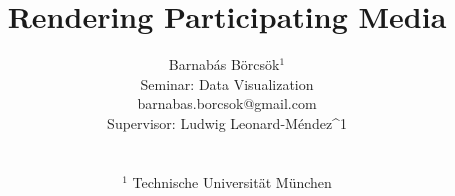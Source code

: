 

\title[Participating Media]%
      {Rendering Participating Media}

\author[B.Börcsök \& L.Leonard]
{\parbox{\textwidth}{\centering Barnabás Börcsök$^1$%
\\ Seminar: Data Visualization %
\\ barnabas.borcsok@gmail.com%
\\ Supervisor: Ludwig Leonard-Méndez^1%
        }
        \\
{\parbox{\textwidth}{\centering $^1$ Technische Universit\"at M\"unchen
       }
}
}

%





